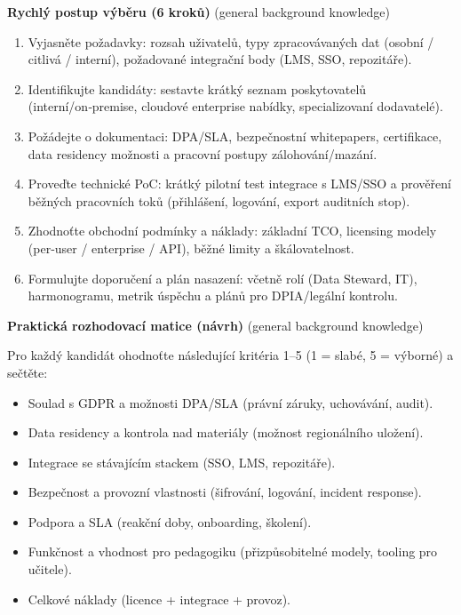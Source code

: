 \documentclass{report}%
\begin{document}
\bigskip

\textbf{Rychlý postup výběru (6 kroků)} (general background knowledge)
\begin{enumerate}
  \item Vyjasněte požadavky: rozsah uživatelů, typy zpracovávaných dat (osobní / citlivá / interní), požadované integrační body (LMS, SSO, repozitáře).
  \item Identifikujte kandidáty: sestavte krátký seznam poskytovatelů (interní/on‑premise, cloudové enterprise nabídky, specializovaní dodavatelé).
  \item Požádejte o dokumentaci: DPA/SLA, bezpečnostní whitepapers, certifikace, data residency možnosti a pracovní postupy zálohování/mazání.
  \item Proveďte technické PoC: krátký pilotní test integrace s LMS/SSO a prověření běžných pracovních toků (přihlášení, logování, export auditních stop).
  \item Zhodnoťte obchodní podmínky a náklady: základní TCO, licensing modely (per‑user / enterprise / API), běžné limity a škálovatelnost.
  \item Formulujte doporučení a plán nasazení: včetně rolí (Data Steward, IT), harmonogramu, metrik úspěchu a plánů pro DPIA/legální kontrolu.
\end{enumerate}

\bigskip

\textbf{Praktická rozhodovací matice (návrh)} (general background knowledge)

\noindent Pro každý kandidát ohodnoťte následující kritéria 1–5 (1 = slabé, 5 = výborné) a sečtěte:
\begin{itemize}
  \item Soulad s GDPR a možnosti DPA/SLA (právní záruky, uchovávání, audit).
  \item Data residency a kontrola nad materiály (možnost regionálního uložení).
  \item Integrace se stávajícím stackem (SSO, LMS, repozitáře).
  \item Bezpečnost a provozní vlastnosti (šifrování, logování, incident response).
  \item Podpora a SLA (reakční doby, onboarding, školení).
  \item Funkčnost a vhodnost pro pedagogiku (přizpůsobitelné modely, tooling pro učitele).
  \item Celkové náklady (licence + integrace + provoz).
\end{itemize}
\end{document}
